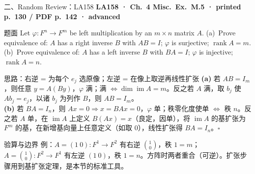 \documentclass[aspectratio=169,10pt,fontset=none]{ctexbeamer}
\newcommand{\ex}[1]{\textcolor{accent}{\footnotesize\bfseries #1}}
\begin{document}
\begin{frame}[t]{二、Random Review：LA158}
  \leavevmode\ex{LA158 · Ch.~4 Misc.\ Ex.~M.5 · printed p.~130 / PDF p.~142 · advanced}
  \begin{block}{\footnotesize 题面}
    \scriptsize Let $\varphi:F^n\to F^m$ be left multiplication by an $m\times n$ matrix $A$. (a)~Prove equivalence of: $A$ has a right inverse $B$ with $AB=I$; $\varphi$ is surjective; $\operatorname{rank}A=m$. (b)~Prove equivalence of: $A$ has a left inverse $B$ with $BA=I$; $\varphi$ is injective; $\operatorname{rank}A=n$.
  \end{block}
  \begin{exampleblock}{\footnotesize 思路：右逆 = 为每个 $e_j$ 选原像；左逆 = 在像上取逆再线性扩张}
    \scriptsize
    \textbf{(a)} 若 $AB=I_m$，则任意 $y=A(By)$，$\varphi$ 满；满 $\Leftrightarrow\dim\operatorname{im}A=m$。反之若 $A$ 满，取 $b_j$ 使 $Ab_j=e_j$，以诸 $b_j$ 为列作 $B$，则 $AB=I_m$。\\[2pt]
    \textbf{(b)} 若 $BA=I_n$，则 $Ax=0\Rightarrow x=BAx=0$，$\varphi$ 单；秩零化度使单 $\Leftrightarrow$ 秩 $n$。反之若 $A$ 单，在 $\operatorname{im}A$ 上定义 $B(Ax)=x$（良定，因单），将 $\operatorname{im}A$ 的基扩张为 $F^m$ 的基，在新增基向量上任意定义（如取 $0$），线性扩张得 $BA=I_n$。$\square$
  \end{exampleblock}
  \begin{block}{\footnotesize 验算与边界}
    \scriptsize 例：$A=(1\ 0):F^1\to F^2$ 有右逆 $\binom10$，秩 $1=m$；$A=\binom10:F^2\to F^1$ 有左逆 $(1\ 0)$，秩 $1=n$。方阵时两者重合（可逆）。扩张步骤用到基扩张定理，是本节的标准工具。
  \end{block}
\end{frame}
\end{document}
